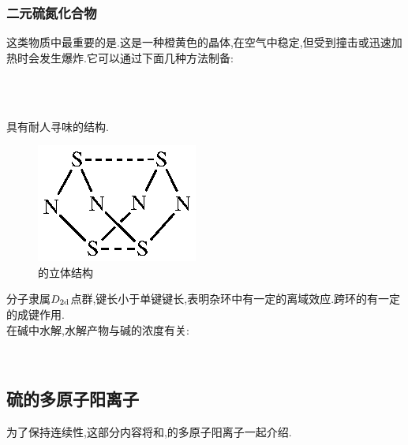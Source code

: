 \documentclass{ctexart}
\begin{document}
\subsubsection{二元硫氮化合物}
这类物质中最重要的是.这是一种橙黄色的晶体,在空气中稳定,但受到撞击或迅速加热时会发生爆炸.它可以通过下面几种方法制备:
\begin{center}
    \\
    \\
\end{center}
\indent{}具有耐人寻味的结构.
\begin{figure}[H]
    \centering\includegraphics{picture/S4N4.eps}
    \caption{的立体结构}
\end{figure}
分子隶属$D_{2\text d}$点群,键长小于单键键长,表明杂环中有一定的离域效应.跨环的有一定的成键作用.\\
\indent {}在碱中水解,水解产物与碱的浓度有关:
\begin{center}
    \\
\end{center}
\subsection{硫的多原子阳离子}
为了保持连续性,这部分内容将和,的多原子阳离子一起介绍.
\end{document}
